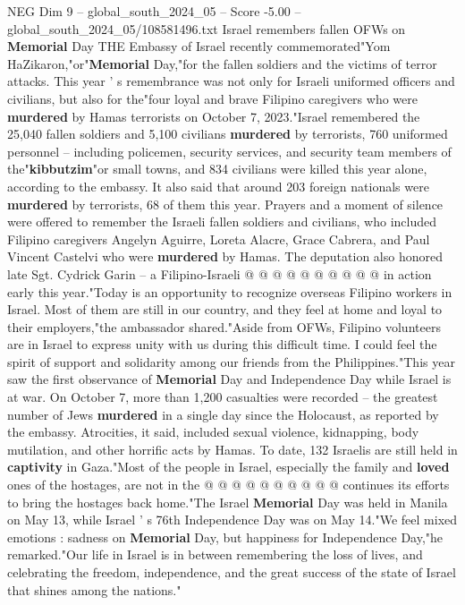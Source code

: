 \begin{textsample}{NEG Dim 9 – global\_south\_2024\_05 – Score -5.00 – global\_south\_2024\_05/108581496.txt}  \label{ex:f9_neg_405}
Israel remembers fallen OFWs on \textbf{Memorial} Day THE Embassy of Israel recently commemorated"Yom HaZikaron,"or"\textbf{Memorial} Day,"for the fallen soldiers and the victims of terror attacks.
This year ' s remembrance was not only for Israeli uniformed officers and civilians, but also for the"four loyal and brave Filipino caregivers who were \textbf{murdered} by Hamas terrorists on October 7, 2023."Israel remembered the 25,040 fallen soldiers and 5,100 civilians \textbf{murdered} by terrorists, 760 uniformed personnel -- including policemen, security services, and security team members of the"\textbf{kibbutzim}"or small towns, and 834 civilians were killed this year alone, according to the embassy.
It also said that around 203 foreign nationals were \textbf{murdered} by terrorists, 68 of them this year.
Prayers and a moment of silence were offered to remember the Israeli fallen soldiers and civilians, who included Filipino caregivers Angelyn Aguirre, Loreta Alacre, Grace Cabrera, and Paul Vincent Castelvi who were \textbf{murdered} by Hamas.
The deputation also honored late Sgt.
Cydrick Garin -- a Filipino-Israeli @ @ @ @ @ @ @ @ @ @ in action early this year."Today is an opportunity to recognize overseas Filipino workers in Israel.
Most of them are still in our country, and they feel at home and loyal to their employers,"the ambassador shared."Aside from OFWs, Filipino volunteers are in Israel to express unity with us during this difficult time.
I could feel the spirit of support and solidarity among our friends from the Philippines."This year saw the first observance of \textbf{Memorial} Day and Independence Day while Israel is at war.
On October 7, more than 1,200 casualties were recorded -- the greatest number of Jews \textbf{murdered} in a single day since the Holocaust, as reported by the embassy.
Atrocities, it said, included sexual violence, kidnapping, body mutilation, and other horrific acts by Hamas.
To date, 132 Israelis are still held in \textbf{captivity} in Gaza."Most of the people in Israel, especially the family and \textbf{loved} ones of the hostages, are not in the @ @ @ @ @ @ @ @ @ @ continues its efforts to bring the hostages back home."The Israel \textbf{Memorial} Day was held in Manila on May 13, while Israel ' s 76th Independence Day was on May 14."We feel mixed emotions : sadness on \textbf{Memorial} Day, but happiness for Independence Day,"he remarked."Our life in Israel is in between remembering the loss of lives, and celebrating the freedom, independence, and the great success of the state of Israel that shines among the nations."

\end{textsample}
